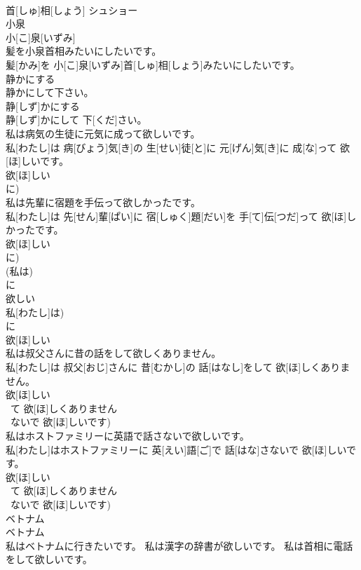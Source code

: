 \documentclass[8pt]{extreport}
\begin{document}
\begin{CJK}{UTF8}{min}
\\	首[しゅ]相[しょう]	シュショー
\\	小泉	
\\	小[こ]泉[いずみ]	
\\	髪を小泉首相みたいにしたいです。	
\\	髪[かみ]を 小[こ]泉[いずみ]首[しゅ]相[しょう]みたいにしたいです。
\\	静かにする 
\\	静かにして下さい。	
\\	静[しず]かにする 
\\	静[しず]かにして 下[くだ]さい。
\\	私は病気の生徒に元気に成って欲しいです。	
\\	私[わたし]は 病[びょう]気[き]の 生[せい]徒[と]に 元[げん]気[き]に 成[な]って 欲[ほ]しいです。 
\\	欲[ほ]しい 
\\	に)
\\	私は先輩に宿題を手伝って欲しかったです。	
\\	私[わたし]は 先[せん]輩[ぱい]に 宿[しゅく]題[だい]を 手[て]伝[つだ]って 欲[ほ]しかったです。 
\\	欲[ほ]しい 
\\	に)
\\	(私は) 
\\	に 
\\	欲しい	
\\	私[わたし]は) 
\\	に 
\\	欲[ほ]しい
\\	私は叔父さんに昔の話をして欲しくありません。	
\\	私[わたし]は 叔父[おじ]さんに 昔[むかし]の 話[はなし]をして 欲[ほ]しくありません。 
\\	欲[ほ]しい 
\\	~て 欲[ほ]しくありません 
\\	~ないで 欲[ほ]しいです)
\\	私はホストファミリーに英語で話さないで欲しいです。	
\\	私[わたし]はホストファミリーに 英[えい]語[ご]で 話[はな]さないで 欲[ほ]しいです。 
\\	欲[ほ]しい 
\\	~て 欲[ほ]しくありません 
\\	~ないで 欲[ほ]しいです)
\\	ベトナム	
\\	ベトナム	
\\	私はベトナムに行きたいです。 私は漢字の辞書が欲しいです。 私は首相に電話をして欲しいです。	

\end{CJK}
\end{document}
